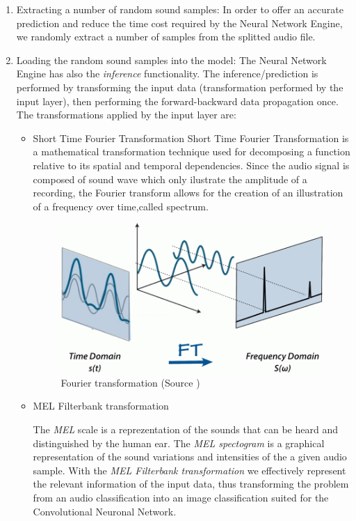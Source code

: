 \begin{enumerate}
	\item Extracting a number of random sound samples: In order to offer an accurate prediction and reduce the
	time cost required by the Neural Network Engine, we randomly extract a number of samples from the splitted audio
	file.
\item Loading the random sound samples into the model: The Neural Network Engine has also the \textit{inference}
	functionality. The inference/prediction is performed by transforming the input data (transformation performed
	by the input layer), then performing the forward-backward data propagation once.
	The transformations applied by the input layer are:
	\begin{itemize}

		\item Short Time Fourier Transformation
		Short Time Fourier Transformation is a mathematical transformation technique used for
		decomposing a function relative to its spatial and temporal dependencies. Since the audio signal is
		composed of sound wave which only ilustrate the amplitude of
		a recording, the Fourier transform allows for the creation of an illustration of a frequency
		over time,called spectrum. \cite{ft}

			\begin{figure}[H]
				\centering
				\includegraphics[width = 4.5in]{images/ft.png}
				\caption{Fourier transformation (Source \cite{ft})}
			\label{ft}
			\end{figure}


		\item MEL Filterbank transformation

			The \textit{MEL} scale is a reprezentation of the sounds that can be heard and
			distinguished by the human ear. The \textit{MEL spectogram} is a graphical representation
			of the sound variations and intensities of the a given audio sample. With the
			\textit{MEL Filterbank transformation} we effectively represent the relevant information
			of the input data, thus transforming the problem from an audio classification
			into an image classification suited for the Convolutional Neuronal Network.


\end{itemize}
\end{enumerate}
